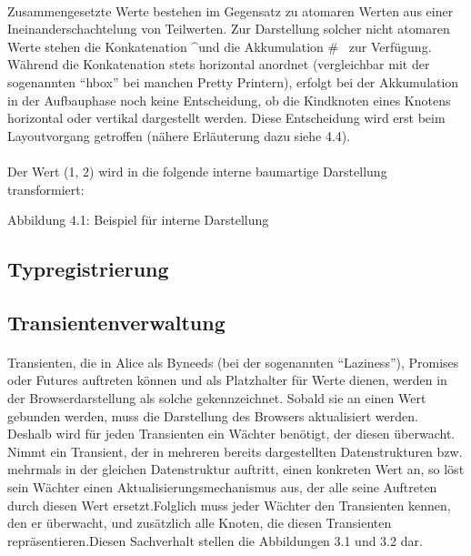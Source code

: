 \documentclass[12pt,a4paper]{article}
\begin{document}
\paragraph{}

Zusammengesetzte Werte bestehen im Gegensatz zu atomaren Werten aus einer
Ineinanderschachtelung von Teilwerten. Zur Darstellung solcher nicht atomaren
Werte stehen die Konkatenation \^\quad und die Akkumulation 
\# \lbrack \, \rbrack \quad zur Verf\"ugung.
W\"ahrend die Konkatenation stets horizontal anordnet (vergleichbar mit der 
sogenannten ``hbox'' bei manchen Pretty Printern), 
erfolgt bei der Akkumulation in der Aufbauphase 
noch keine Entscheidung, ob die Kindknoten eines Knotens horizontal oder 
vertikal dargestellt werden. Diese Entscheidung wird erst beim Layoutvorgang
getroffen (n\"ahere Erl\"auterung dazu siehe 4.4).

\paragraph{}

Der Wert \large{(1, 2)} \normalsize wird in die folgende interne 
baumartige Darstellung transformiert: \\

\begin{center}
\linebreak Abbildung 4.1: Beispiel f\"ur interne Darstellung
\end{center}


\subsection{Typregistrierung}


\subsection{Transientenverwaltung}

\paragraph{}

Transienten, die in Alice als Byneeds (bei der sogenannten ``Laziness''), 
Promises oder Futures auftreten k\"onnen und als Platzhalter f\"ur Werte
dienen, werden in der Browserdarstellung
als solche gekennzeichnet. Sobald sie an einen Wert gebunden werden, muss
die Darstellung des Browsers aktualisiert werden. Deshalb wird
f\"ur jeden Transienten ein W\"achter ben\"otigt, der diesen \"uberwacht.
Nimmt ein Transient, der in mehreren bereits dargestellten 
Datenstrukturen bzw. mehrmals in der gleichen Datenstruktur auftritt, 
einen konkreten Wert an, so l\"ost sein W\"achter einen 
Aktualisierungsmechanismus aus, der alle seine Auftreten durch diesen 
Wert ersetzt.Folglich muss jeder W\"achter den Transienten kennen, 
den er \"uberwacht, und zus\"atzlich alle Knoten, die diesen 
Transienten repr\"asentieren.Diesen Sachverhalt stellen die 
Abbildungen 3.1 und 3.2 dar.
\end{document}
